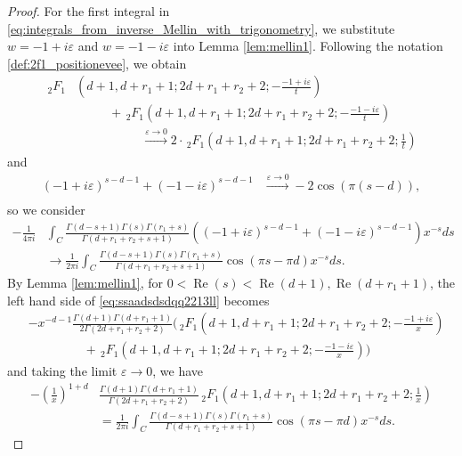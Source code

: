 \documentclass[]{article}
\renewcommand{\Re}{\operatorname{Re}}
\begin{document}
\begin{proof}
For the first integral in \eqref{eq:integrals_from_inverse_Mellin_with_trigonometry}, we substitute  $w = -1+i\varepsilon$ and $w = -1-i\varepsilon$ into Lemma \ref{lem:mellin1}. 
Following the notation  \eqref{def:2f1_positionevee}, we obtain 
\begin{equation}
\begin{split}
     \, _2 F_1&\left(d+1,d+r_1+1;2 d+r_1+r_2+2;-\frac{-1+i\varepsilon}{t}\right) \\
    & \ \ \ \ \ \ \ \ \ \ \ \ +     \, _2 F_1\left(d+1,d+r_1+1;2 d+r_1+r_2+2;-\frac{-1-i\varepsilon}{t}\right) \\
    & \ \ \ \ \ \ \ \ \ \ \ \ \ \ \ \  \ \ \ \ \ \ \ \  \stackrel{ \varepsilon \to 0 }{\to} 2  \cdot   \, _2 F_1\left(d+1,d+r_1+1;2 d+r_1+r_2+2;\frac{1}{t}\right)
\end{split}
\end{equation}
and 
\begin{equation}\label{eq:2f1atvutis44}
\begin{split}
    (-1+i\varepsilon)^{s-d-1}+(-1-i\varepsilon)^{s-d-1} & 
    \stackrel{ \varepsilon \to 0 }{\to} %
    - 2 \cos(\pi ( s -  d) ), \\ 
\end{split}
\end{equation}
so we consider
\begin{equation}\label{eq:ssaadsdsdqq2213ll}
\begin{split}
- \frac{1}{4 \pi i}& \int_C \frac{\Gamma (d-s+1) \Gamma (s)  \Gamma (r_1+s)}{\Gamma (d+r_1+r_2+s+1)} \left((-1+i\varepsilon)^{s-d-1}+(-1-i\varepsilon)^{s-d-1} \right)x^{-s} ds\\
 & \to \frac{1}{2 \pi i} \int_C \frac{\Gamma (d-s+1) \Gamma (s)  \Gamma (r_1+s)}{\Gamma (d+r_1+r_2+s+1)} \cos( \pi s - \pi d   ) x^{-s} ds. 
    \end{split}
\end{equation}
By Lemma \ref{lem:mellin1},  for $0<\Re(s)<\Re(d+1),\Re(d+r_1+1)$,  the left hand side of \eqref{eq:ssaadsdsdqq2213ll} becomes 
\begin{equation}
\begin{split}
 &- x^{-d-1} \frac{\Gamma (d+1) \Gamma (d+r_1+1)}{ 2 \Gamma(2 d+r_1+r_2+2) }  \Big(\, _2 F_1\left(d+1,d+r_1+1;2 d+r_1+r_2+2;-\frac{-1+i\varepsilon}{x}\right)\\ &  \ \ \ \   \ \ \ \ \ \ \ \ \ \ \ \ \ \ \ \ + \,_2 F_1\left(d+1,d+r_1+1;2 d+r_1+r_2+2;-\frac{-1-i\varepsilon}{x}\right)\Big)
  \end{split}
\end{equation}
and taking the limit $\varepsilon\to 0$, we have 
\begin{equation}
\begin{split}
- \left(\frac{1}{x}\right)^{1+d} &\frac{\Gamma (d+1) \Gamma (d+r_1+1)}{  \Gamma(2 d+r_1+r_2+2) }  \, _2 F_1\left(d+1,d+r_1+1;2 d+r_1+r_2+2;\frac{1}{x}\right)\\
  &=  \frac{1}{2 \pi i} \int_C \frac{\Gamma (d-s+1) \Gamma (s)  \Gamma (r_1+s)}{\Gamma (d+r_1+r_2+s+1)} \cos( \pi s - \pi d   ) x^{-s} ds .
    \end{split}
\end{equation}


\end{proof}
\end{document}

